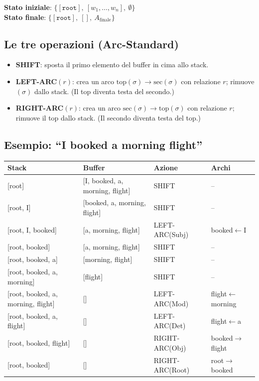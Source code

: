 \documentclass[12pt,a4paper]{article}
\begin{document}
\textbf{Stato iniziale}: $\{[\texttt{root}],\ [w_1,\dots,w_n],\ \emptyset\}$\\
\textbf{Stato finale}: $\{[\texttt{root}],\ [],\ A_{\text{finale}}\}$

\subsection{Le tre operazioni (Arc-Standard)}

\begin{defbox}
\begin{itemize}[leftmargin=1.5em]
  \item \textbf{SHIFT}: sposta il primo elemento del buffer in cima allo stack.
  \item \textbf{LEFT-ARC$(r)$}: crea un arco $\text{top}(\sigma) \to \text{sec}(\sigma)$ con relazione $r$; rimuove $(\sigma)$ dallo stack. (Il top diventa testa del secondo.)
  \item \textbf{RIGHT-ARC$(r)$}: crea un arco $\text{sec}(\sigma) \to \text{top}(\sigma)$ con relazione $r$; rimuove il top dallo stack. (Il secondo diventa testa del top.)
\end{itemize}
\end{defbox}

\subsection{Esempio: ``I booked a morning flight''}

\begin{center}
\begin{tabular}{llll}
\toprule
\textbf{Stack} & \textbf{Buffer} & \textbf{Azione} & \textbf{Archi} \\
\midrule
{[root]} & {[I, booked, a, morning, flight]} & SHIFT & -- \\
{[root, I]} & {[booked, a, morning, flight]} & SHIFT & -- \\
{[root, I, booked]} & {[a, morning, flight]} & LEFT-ARC(Subj) & booked$\leftarrow$I \\
{[root, booked]} & {[a, morning, flight]} & SHIFT & -- \\
{[root, booked, a]} & {[morning, flight]} & SHIFT & -- \\
{[root, booked, a, morning]} & {[flight]} & SHIFT & -- \\
{[root, booked, a, morning, flight]} & {[]} & LEFT-ARC(Mod) & flight$\leftarrow$morning \\
{[root, booked, a, flight]} & {[]} & LEFT-ARC(Det) & flight$\leftarrow$a \\
{[root, booked, flight]} & {[]} & RIGHT-ARC(Obj) & booked$\to$flight \\
{[root, booked]} & {[]} & RIGHT-ARC(Root) & root$\to$booked \\
\bottomrule
\end{tabular}
\end{center}
\end{document}
